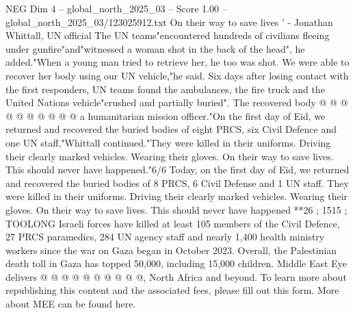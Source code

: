 \begin{textsample}{NEG Dim 4 – global\_north\_2025\_03 – Score 1.00 – global\_north\_2025\_03/123025912.txt}
On their way to save lives ' - Jonathan Whittall, UN official The UN teams"encountered hundreds of civilians fleeing under gunfire"and"witnessed a woman shot in the back of the head", he added."When a young man tried to retrieve her, he too was shot.
We were able to recover her body using our UN vehicle,"he said.
Six days after losing contact with the first responders, UN teams found the ambulances, the fire truck and the United Nations vehicle"crushed and partially buried".
The recovered body @ @ @ @ @ @ @ @ @ @ a humanitarian mission officer."On the first day of Eid, we returned and recovered the buried bodies of eight PRCS, six Civil Defence and one UN staff,"Whittall continued."They were killed in their uniforms.
Driving their clearly marked vehicles.
Wearing their gloves.
On their way to save lives.
This should never have happened."6/6 Today, on the first day of Eid, we returned and recovered the buried bodies of 8 PRCS, 6 Civil Defense and 1 UN staff.
They were killed in their uniforms.
Driving their clearly marked vehicles.
Wearing their gloves.
On their way to save lives.
This should never have happened **26 ; 1515 ; TOOLONG Israeli forces have killed at least 105 members of the Civil Defence, 27 PRCS paramedics, 284 UN agency staff and nearly 1,400 health ministry workers since the war on Gaza began in October 2023.
Overall, the Palestinian death toll in Gaza has topped 50,000, including 15,000 children.
Middle East Eye delivers @ @ @ @ @ @ @ @ @ @, North Africa and beyond.
To learn more about republishing this content and the associated fees, please fill out this form.
More about MEE can be found here.

\end{textsample}

